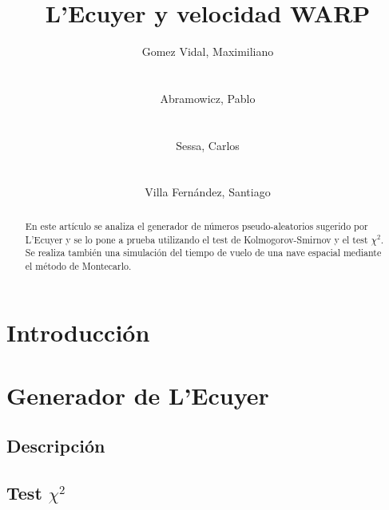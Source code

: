 \documentclass{sig-alternate}
\begin{document}
\title{L'Ecuyer y velocidad WARP}


\author{
    \alignauthor
    Gomez Vidal, Maximiliano\\
     \\
    \ \\
    Abramowicz, Pablo\\
     \\
    \ \\
    \alignauthor
    Sessa, Carlos\\
     \\
    \ \\
    Villa Fern\'{a}ndez, Santiago\\
}

\maketitle

\begin{abstract}
En este art\'{i}culo se analiza el generador de n\'{u}meros pseudo-aleatorios
sugerido por L'Ecuyer y se lo pone a prueba utilizando el test de 
Kolmogorov-Smirnov y el test $\chi^{2}$. Se realiza tambi\'{e}n una simulaci\'{o}n
del tiempo de vuelo de una nave espacial mediante el m\'{e}todo de Montecarlo.
\end{abstract}


\section{Introducci\'{o}n}\label{introduccion}

\section{Generador de L'Ecuyer}\label{generador}

\subsection{Descripci\'{o}n}\label{descripciongenerador}

\subsection{Test $\chi^{2}$}\label{testchicuadrado}
\end{document}
